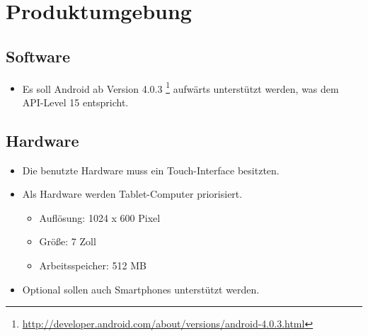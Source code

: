 \section{Produktumgebung}

\subsection{Software}
\begin{itemize}
	\item Es soll Android ab Version 4.0.3 \footnote{\url{http://developer.android.com/about/versions/android-4.0.3.html}} aufwärts unterstützt werden, was dem API-Level 15 entspricht.
\end{itemize}
\subsection{Hardware}
\begin{itemize}
	\item Die benutzte Hardware muss ein Touch-Interface besitzten.
	\item Als Hardware werden Tablet-Computer priorisiert.
	\begin{itemize}
		\item Auflösung: 1024 x 600 Pixel
		\item Größe: 7 Zoll
		\item Arbeitsspeicher: 512 MB
	\end{itemize}
	\item Optional sollen auch Smartphones unterstützt werden.
\end{itemize}
